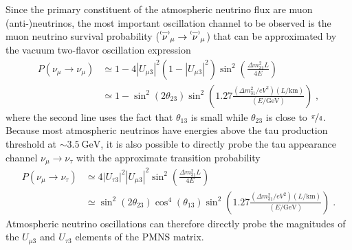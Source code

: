 Since the primary constituent of the atmospheric neutrino flux are muon (anti-)neutrinos, the most important oscillation channel to be observed is the muon neutrino survival probability ($\pbar{\nu}_\mu \rightarrow \pbar{\nu}_\mu$) that can be approximated by the vacuum two-flavor oscillation expression
\begin{equation}
    \begin{aligned}
        P(\nu_\mu\rightarrow\nu_\mu)
        &\simeq
        1 - 4|U_{\mu 3}|^2(1-|U_{\mu3}|^2)\sin^2\left(\frac{\Delta m^2_{31}L}{4E}\right)\\
        &\simeq
        1 - \sin^2(2\theta_{23})\sin^2\left(1.27\frac{(\Delta m^2_{31}/\si{eV^2})(L/\si{\kilo\meter})}{(E/\si{\giga\electronvolt})}\right)\;,
    \end{aligned}\label{eq:atmo-two-flav-approx}
\end{equation}
where the second line uses the fact that $\theta_{13}$ is small while $\theta_{23}$ is close to $\nicefrac{\pi}{4}$.
Because most atmospheric neutrinos have energies above the tau production threshold at $\sim\SI{3.5}{\giga\electronvolt}$, it is also possible to directly probe the tau appearance channel $\nu_\mu \rightarrow \nu_\tau$ with the approximate transition probability
\begin{equation}
    \begin{aligned}
        P(\nu_\mu\rightarrow\nu_\tau)
        &\simeq
        4|U_{\tau 3}|^2|U_{\mu3}|^2\sin^2\left(\frac{\Delta m^2_{31}L}{4E}\right)\\
        &\simeq
        \sin^2(2\theta_{23})\cos^4(\theta_{13})\sin^2\left(1.27\frac{(\Delta m^2_{31}/\si{eV^2})(L/\si{\kilo\meter})}{(E/\si{\giga\electronvolt})}\right)\;.
    \end{aligned}\label{eq:atmo-two-flav-approx-nutau}
\end{equation}
Atmospheric neutrino oscillations can therefore directly probe the magnitudes of the $U_{\mu3}$ and $U_{\tau3}$ elements of the PMNS matrix.

